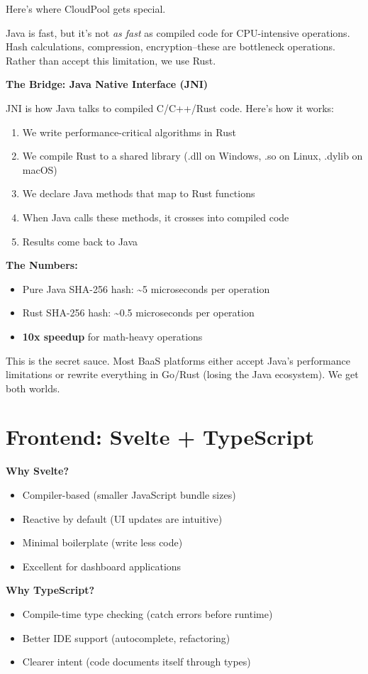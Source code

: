 \documentclass[11pt,a4paper]{report}
\begin{document}
Here's where CloudPool gets special.

Java is fast, but it's not \textit{as fast} as compiled code for CPU-intensive operations. Hash calculations, compression, encryption--these are bottleneck operations. Rather than accept this limitation, we use Rust.

\textbf{The Bridge: Java Native Interface (JNI)}

JNI is how Java talks to compiled C/C++/Rust code. Here's how it works:

\begin{enumerate}
\item We write performance-critical algorithms in Rust
\item We compile Rust to a shared library (.dll on Windows, .so on Linux, .dylib on macOS)
\item We declare Java methods that map to Rust functions
\item When Java calls these methods, it crosses into compiled code
\item Results come back to Java

\end{enumerate}
\textbf{The Numbers:}
\begin{itemize}
\item Pure Java SHA-256 hash: {\textasciitilde}5 microseconds per operation
\item Rust SHA-256 hash: {\textasciitilde}0.5 microseconds per operation
\item \textbf{10x speedup} for math-heavy operations

\end{itemize}
This is the secret sauce. Most BaaS platforms either accept Java's performance limitations or rewrite everything in Go/Rust (losing the Java ecosystem). We get both worlds.


\section{Frontend: Svelte + TypeScript}


\textbf{Why Svelte?}
\begin{itemize}
\item Compiler-based (smaller JavaScript bundle sizes)
\item Reactive by default (UI updates are intuitive)
\item Minimal boilerplate (write less code)
\item Excellent for dashboard applications

\end{itemize}
\textbf{Why TypeScript?}
\begin{itemize}
\item Compile-time type checking (catch errors before runtime)
\item Better IDE support (autocomplete, refactoring)
\item Clearer intent (code documents itself through types)

\end{itemize}
\end{document}

